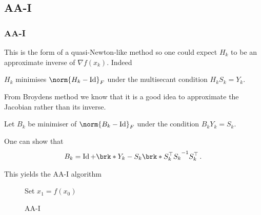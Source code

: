 \subsection{AA-I}
\begin{frame}
	\frametitle{AA-I}
	This is the form of a quasi-Newton-like method so one could expect $H_k$ to be an approximate inverse of $\nabla f(x_k)$. Indeed
	\begin{proposition}
		$H_k$ minimises $\norm{H_k-\Id}_F$ under the multisecant condition $H_kS_k=Y_k$.
	\end{proposition}
	From Broydens method we know that it is a good idea to approximate the Jacobian rather than its inverse.
	\begin{definition}
		Let $B_k$ be minimiser of $\norm{B_k-\Id}_F$ under the condition $B_kY_k=S_k$.
	\end{definition}
	One can show that
	\begin{align*}
		B_k = \Id+\brk*{Y_k-S_k}\brk*{S_k^\top S_k}^{-1}S_k^\top\,.
	\end{align*}
\end{frame}

\begin{frame}
	This yields the AA-I algorithm
	\begin{figure}
	\begin{algorithm}[H]
	\caption{AA-I}
	\color{gray}
	\BlankLine
	Set $x_1=f(x_0)$
	
	\end{algorithm}
	\end{figure}
\end{frame}

